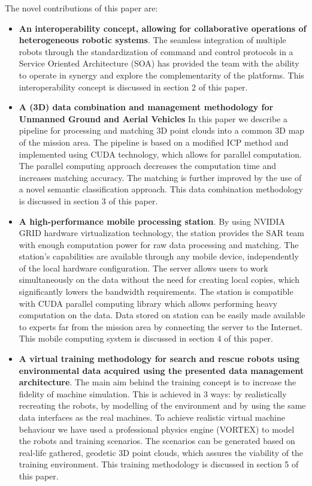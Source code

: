 \documentclass{article}
\begin{document}
The novel contributions of this paper are:
\begin{itemize}
\item{\textbf{An interoperability concept, allowing for collaborative operations of heterogeneous robotic systems}.
The seamless integration of multiple robots through the standardization of command and control protocols in a Service Oriented Architecture (SOA) has provided the team with the ability to operate in synergy and explore the complementarity of the platforms. This interoperability concept is discussed in section 2 of this paper.}
\item {\textbf{A (3D) data combination and management methodology for Unmanned Ground and Aerial Vehicles}
In this paper we describe a pipeline for processing and matching 3D point clouds into a common 3D map of the mission area. The pipeline is based on a modified ICP method and implemented using CUDA technology, which allows for parallel computation. The parallel computing approach decreases the computation time and increases matching accuracy. The matching is further improved by the use of a novel semantic classification approach. This data combination methodology is discussed in section 3 of this paper. }
\item{\textbf{A high-performance mobile processing station}.
By using NVIDIA GRID hardware virtualization technology, the station provides the SAR team with enough computation power for raw data processing and matching. The station's capabilities are available through any mobile device, independently of the local hardware configuration. The server allows users to work simultaneously on the data without the need for creating local copies, which significantly lowers the bandwidth requirements. The station is compatible with CUDA parallel computing library which allows performing heavy computation on the data. Data stored on station can be easily made available to experts far from the mission area by connecting the server to the Internet. This mobile computing system is discussed in section 4 of this paper.}
\item{\textbf{A virtual training methodology for search and rescue robots using environmental data acquired using the presented data management architecture}.
The main aim behind the training concept is to increase the fidelity of machine simulation. This is achieved in 3 ways: by realistically recreating the robots, by modelling of the environment and by using the same data interfaces as the real machines. To achieve realistic virtual machine behaviour we have used a professional physics engine (VORTEX) to model the robots and training scenarios. The scenarios can be generated based on real-life gathered, geodetic 3D point clouds, which assures the viability of the training environment. This training methodology is discussed in section 5 of this paper.}

\end{itemize}
\end{document}

